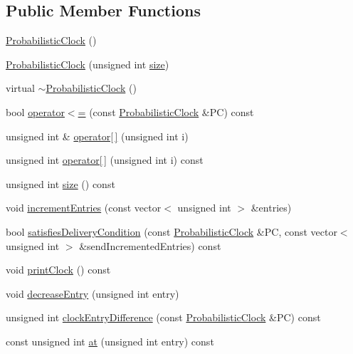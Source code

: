 \subsection*{Public Member Functions}
\begin{DoxyCompactItemize}
\item 
\hyperlink{classProbabilisticClock_aa879f0e457bc70644b6e4f2114215987}{Probabilistic\+Clock} ()
\item 
\hyperlink{classProbabilisticClock_ab356688e8403176b4211349cba56b9b1}{Probabilistic\+Clock} (unsigned int \hyperlink{classProbabilisticClock_ad0cdbd2ad50309fae0665df4ee5247ba}{size})
\item 
virtual \hyperlink{classProbabilisticClock_a11743513addcaaa0d8f0b0d0c74ae2ae}{$\sim$\+Probabilistic\+Clock} ()
\item 
bool \hyperlink{classProbabilisticClock_a071b29d8c7ebb91528db4739a846dc71}{operator$<$=} (const \hyperlink{classProbabilisticClock}{Probabilistic\+Clock} \&PC) const
\item 
unsigned int \& \hyperlink{classProbabilisticClock_a349a0bcb8c21b89c3e6b30b043f16936}{operator\mbox{[}$\,$\mbox{]}} (unsigned int i)
\item 
unsigned int \hyperlink{classProbabilisticClock_a28398d6b8c5a92b73a7d6260e3f3e7e1}{operator\mbox{[}$\,$\mbox{]}} (unsigned int i) const
\item 
unsigned int \hyperlink{classProbabilisticClock_ad0cdbd2ad50309fae0665df4ee5247ba}{size} () const
\item 
void \hyperlink{classProbabilisticClock_a5c510e2d21bc580468c491a71382a4d4}{increment\+Entries} (const vector$<$ unsigned int $>$ \&entries)
\item 
bool \hyperlink{classProbabilisticClock_a56bced001a856aa04168d787cc2dd549}{satisfies\+Delivery\+Condition} (const \hyperlink{classProbabilisticClock}{Probabilistic\+Clock} \&PC, const vector$<$ unsigned int $>$ \&send\+Incremented\+Entries) const
\item 
void \hyperlink{classProbabilisticClock_a1169d9d5442d55c4dd4e2e730bc2b008}{print\+Clock} () const
\item 
void \hyperlink{classProbabilisticClock_aaa864cb9c0e2cfcf0bf28a3f534e0c6a}{decrease\+Entry} (unsigned int entry)
\item 
unsigned int \hyperlink{classProbabilisticClock_ad119fc48edd9537cfdb0ab77e640f614}{clock\+Entry\+Difference} (const \hyperlink{classProbabilisticClock}{Probabilistic\+Clock} \&PC) const
\item 
const unsigned int \hyperlink{classProbabilisticClock_a81a017c569c1a57e5c567b701a64e5c9}{at} (unsigned int entry) const
\end{DoxyCompactItemize}
